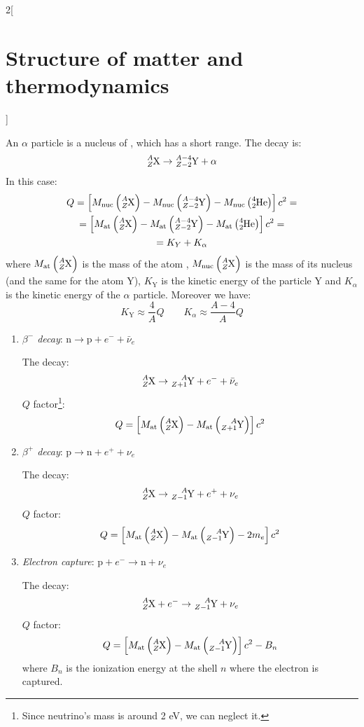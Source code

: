\documentclass[../../../main.tex]{subfiles}
\begin{document}
\begin{multicols}{2}[\section{Structure of matter and thermodynamics}]
\begin{definition}[Q value]
  \end{definition}
  \begin{definition}
    An $\alpha$ particle is a nucleus of , which has a short range.
    The decay is: $$\ce{^$A$_$Z$X}\rightarrow\ce{^$A-4$_$Z-2$Y}+\alpha$$
    In this case:
    \begin{multline*}
      Q=\left[M_\text{nuc}\left(\ce{^$A$_$Z$X}\right)-M_\text{nuc}\left(\ce{^$A-4$_$Z-2$Y}\right)-M_\text{nuc}\left(\ce{^4_2He}\right)\right]c^2=\\=\left[M_\text{at}\left(\ce{^$A$_$Z$X}\right)-M_\text{at}\left(\ce{^$A-4$_$Z-2$Y}\right)-M_\text{at}\left(\ce{^4_2He}\right)\right]c^2=\\=K_Y+K_\alpha
    \end{multline*}
    where $M_\text{at}\left(\ce{^$A$_$Z$X}\right)$ is the mass of the atom , $M_\text{nuc}\left(\ce{^$A$_$Z$X}\right)$ is the mass of its nucleus (and the same for the atom Y), $K_\text{Y}$ is the kinetic energy of the particle Y and $K_\alpha$ is the kinetic energy of the $\alpha$ particle. Moreover we have: $$K_\text{Y}\approx \frac{4}{A}Q\qquad K_\alpha\approx \frac{A-4}{A}Q$$
  \end{definition}
  \begin{definition}
    \hfill
    \begin{enumerate}
      \item \emph{$\beta^-$ decay}: $\text{n}\rightarrow\text{p}+e^-+\bar{\nu}_e$\par
            The decay: $$\ce{^$A$_$Z$X}\rightarrow\ce{^$A$_$Z+1$Y}+e^-+\bar{\nu}_e$$
            $Q$ factor\footnote{Since neutrino's mass is around 2 eV, we can neglect it.}: $$Q=\left[M_\text{at}\left(\ce{^$A$_$Z$X}\right)-M_\text{at}\left(\ce{^$A$_$Z+1$Y}\right)\right]c^2$$
      \item \emph{$\beta^+$ decay}: $\text{p}\rightarrow\text{n}+e^++\nu_e$\par
            The decay: $$\ce{^$A$_$Z$X}\rightarrow\ce{^$A$_$Z-1$Y}+e^++\nu_e$$
            $Q$ factor: $$Q=\left[M_\text{at}\left(\ce{^$A$_$Z$X}\right)-M_\text{at}\left(\ce{^$A$_$Z-1$Y}\right)-2m_e\right]c^2$$
      \item \emph{Electron capture}: $\text{p}+e^-\rightarrow\text{n}+\nu_e$\par
            The decay: $$\ce{^$A$_$Z$X}+e^-\rightarrow\ce{^$A$_$Z-1$Y}+\nu_e$$
            $Q$ factor: $$Q=\left[M_\text{at}\left(\ce{^$A$_$Z$X}\right)-M_\text{at}\left(\ce{^$A$_$Z-1$Y}\right)\right]c^2-B_n$$
            where $B_n$ is the ionization energy at the shell $n$ where the electron is captured.

\end{enumerate}
\end{definition}
\end{multicols}
\end{document}
